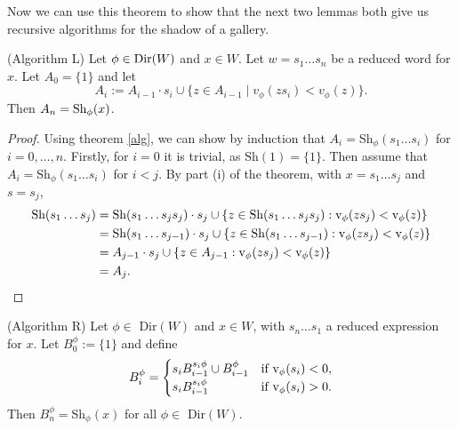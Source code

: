 \documentclass[11pt]{article}
\begin{document}

Now we can use this theorem to show that the next two lemmas both give us recursive algorithms for the shadow of a gallery. 

\begin{lemma} (Algorithm L)
    Let $\phi\in\textnormal{Dir}(W)$ and $x\in W$. Let $w=s_1\hdots s_n$ be a reduced word for $x$. Let $A_0=\{1\}$ and let
    \[A_i:=A_{i-1}\cdot s_i\cup \{z\in A_{i-1}\mid v_\phi(zs_i)<v_\phi(z)\}.\]
    Then $A_n=\textnormal{Sh}_\phi(x)$. 
\end{lemma}

\begin{proof}
    Using theorem \ref{alg}, we can show by induction that $A_i=$Sh$_\phi(s_1\hdots s_i)$ for $i=0,\hdots ,n$. Firstly, for $i=0$ it is trivial, as Sh$(1)=\{1\}$. Then assume that $A_i=$Sh$_\phi(s_1\hdots s_i)$ for $i<j$. By part (i) of the theorem, with $x=s_1\hdots s_j$ and $s=s_j$, \[\begin{aligned} 
    \textnormal{Sh}(s_1\hdots s_j)& = \textnormal{Sh}(s_1\hdots s_js_j)\cdot s_j \cup \{z\in \textnormal{Sh}(s_1\hdots s_js_j): \textnormal{v}_\phi(zs_j)<\textnormal{v}_\phi(z)\}\\
        & = \textnormal{Sh}(s_1\hdots s_{j-1})\cdot s_j \cup \{z\in \textnormal{Sh}(s_1\hdots s_{j-1}): \textnormal{v}_\phi(zs_j)<\textnormal{v}_\phi(z)\}\\
        & = A_{j-1}\cdot s_j \cup \{z\in A_{j-1}: \textnormal{v}_\phi(zs_j)<\textnormal{v}_\phi(z)\}\\
        & = A_j.
    \end{aligned}\]
\end{proof}

\begin{lemma} (Algorithm R)
    Let $\phi\in$ Dir$(W)$ and $x\in W$, with $s_n\hdots s_1$ a reduced expression for $x$. Let $B_0^\phi:=\{1\}$ and define
    \[B_i^\phi = \begin{cases}
        s_iB_{i-1}^{s_i\phi}\cup B_{i-1}^\phi & \textnormal{if v}_\phi(s_i)<0,\\
        s_iB_{i-1}^{s_i\phi} & \textnormal{if v}_\phi(s_i)>0.
    \end{cases}\]
    Then $B^\phi_n=$Sh$_\phi(x)$ for all $\phi\in$ Dir$(W)$. 
\end{lemma}
\end{document}
